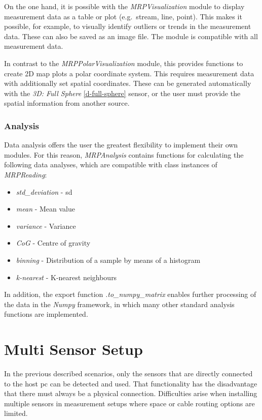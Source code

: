 On the one hand, it is possible with the \emph{MRPVisualization} module
to display measurement data as a table or plot (e.g.~stream, line,
point). This makes it possible, for example, to visually identify
outliers or trends in the measurement data. These can also be saved as
an image file. The module is compatible with all measurement data.

In contrast to the \emph{MRPPolarVisualization} module, this provides
functions to create 2D map plots a polar coordinate system. This
requires measurement data with additionally set spatial coordinates.
These can be generated automatically with the \emph{3D: Full Sphere}
\ref{d-full-sphere} sensor, or the user must provide the spatial
information from another source.

\hypertarget{analysis}{%
\subsubsection{Analysis}\label{analysis}}

Data analysis offers the user the greatest flexibility to implement
their own modules. For this reason, \emph{MRPAnalysis} contains
functions for calculating the following data analyses, which are
compatible with class instances of \emph{MRPReading}:

\begin{itemize}
\tightlist
\item
  \emph{std\_deviation} - \gls{sd}
\item
  \emph{mean} - Mean value
\item
  \emph{variance} - Variance
\item
  \emph{CoG} - Centre of gravity
\item
  \emph{binning} - Distribution of a sample by means of a histogram
\item
  \emph{k-nearest} - K-nearest neighbours
\end{itemize}

In addition, the export function \emph{.to\_numpy\_matrix} enables
further processing of the data in the \emph{Numpy} 
framework, in which many other standard analysis functions are
implemented.

\hypertarget{multi-sensor-setup}{%
\section{Multi Sensor Setup}\label{multi-sensor-setup}}

In the previous described scenarios, only the sensors that are directly
connected to the host \gls{pc} can be detected and used. That
functionality has the disadvantage that there must always be a physical
connection. Difficulties arise when installing multiple sensors in
measurement setups where space or cable routing options are limited.

